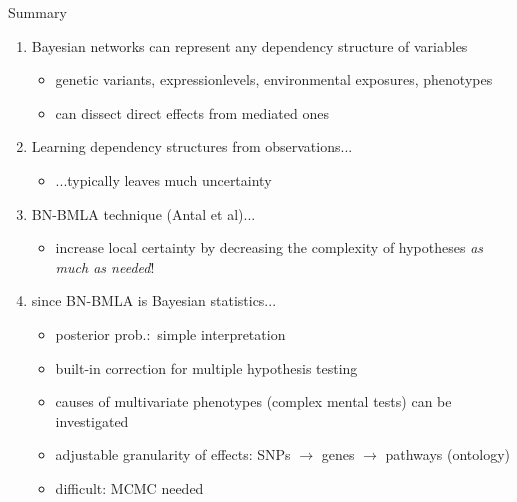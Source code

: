 \documentclass[aspectratio=169]{beamer}
\begin{document}
\begin{frame}{Summary}
\begin{enumerate}
  \item Bayesian networks can represent any dependency structure of variables
  \begin{itemize}
    \item genetic variants, expressionlevels, environmental exposures, phenotypes
    \item can dissect direct effects from mediated ones
  \end{itemize}
  \item Learning dependency structures from observations...
  \begin{itemize}
    \item ...typically leaves much uncertainty
  \end{itemize}
  \item BN-BMLA technique (Antal et al)...
  \begin{itemize}
    \item increase local certainty by decreasing the complexity of hypotheses \emph{as much as needed}!
  \end{itemize}
  \item<2-> since BN-BMLA is Bayesian statistics...
  \begin{itemize}
    \item posterior prob.:~simple interpretation
    \item built-in correction for multiple
      hypothesis testing
    \item causes of multivariate phenotypes (complex mental tests) can be investigated
    \item adjustable granularity of effects: SNPs $\to$ genes $\to$ pathways (ontology)
    \item difficult: MCMC needed
  \end{itemize}
\end{enumerate}
\end{frame}
\end{document}
